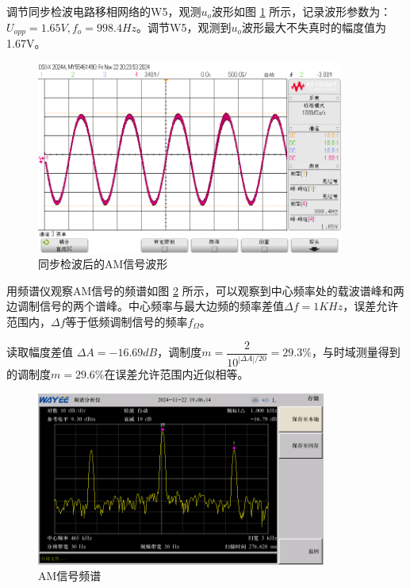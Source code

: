 \documentclass[UTF8]{ctexart}
\begin{document}
调节同步检波电路移相网络的W5，观测$u_o$波形如图 \ref{fig:14} 所示，记录波形参数为：
$U_{opp}=1.65V,f_o=998.4Hz$。调节W5，观测到$u_o$波形最大不失真时的幅度值为1.67V。
\begin{figure}[H]
    \centering
    \includegraphics[width=0.9\textwidth]{pics/14.png}
    \caption{同步检波后的AM信号波形}\label{fig:14}
\end{figure}

用频谱仪观察AM信号的频谱如图 \ref{fig:15} 所示，可以观察到中心频率处的载波谱峰和两边调制信号的两个谱峰。中心频率与最大边频的频率差值$\Delta f=1KHz$，误差允许范围内，$\Delta f$等于低频调制信号的频率$f_\Omega$。

读取幅度差值 $\Delta A=-16.69dB$，调制度$m=\dfrac{2}{10^{\left\lvert \Delta A\right\rvert/20 }}=29.3\%$，与时域测量得到的调制度$m=29.6\%$在误差允许范围内近似相等。
\begin{figure}[H]
    \centering
    \includegraphics[width=0.85\textwidth]{pics/15.png}
    \caption{AM信号频谱}\label{fig:15}
\end{figure}
\end{document}
